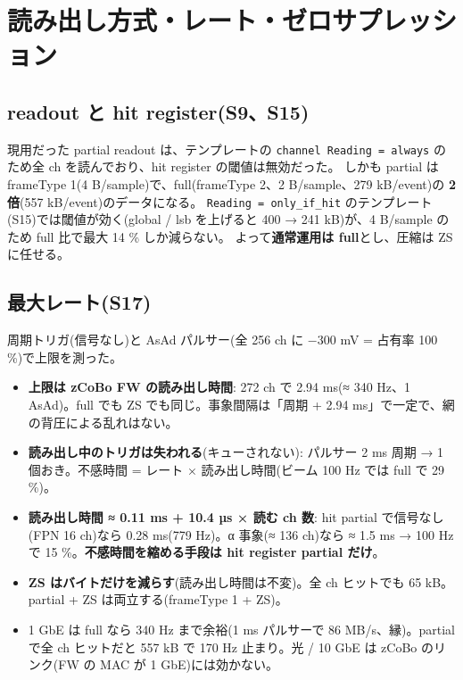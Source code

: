 \documentclass[a4paper,11pt]{ltjsarticle}
\begin{document}
\section{読み出し方式・レート・ゼロサプレッション}

\subsection{readout と hit register(S9、S15)}
現用だった partial readout は、テンプレートの \texttt{channel Reading = always} のため全 ch を読んでおり、hit register の閾値は無効だった。
しかも partial は frameType 1(4 B/sample)で、full(frameType 2、2 B/sample、279 kB/event)の \textbf{2 倍}(557 kB/event)のデータになる。
\texttt{Reading = only\_if\_hit} のテンプレート(S15)では閾値が効く(global / lsb を上げると 400 → 241 kB)が、4 B/sample のため full 比で最大 14 \% しか減らない。
よって\textbf{通常運用は full}とし、圧縮は ZS に任せる。

\subsection{最大レート(S17)}
周期トリガ(信号なし)と AsAd パルサー(全 256 ch に $-300$ mV = 占有率 100 \%)で上限を測った。
\begin{itemize}
\item \textbf{上限は zCoBo FW の読み出し時間}: 272 ch で 2.94 ms(≈ 340 Hz、1 AsAd)。full でも ZS でも同じ。事象間隔は「周期 + 2.94 ms」で一定で、網の背圧による乱れはない。
\item \textbf{読み出し中のトリガは失われる}(キューされない): パルサー 2 ms 周期 → 1 個おき。不感時間 = レート × 読み出し時間(ビーム 100 Hz では full で 29 \%)。
\item \textbf{読み出し時間 ≈ 0.11 ms + 10.4 µs × 読む ch 数}: hit partial で信号なし(FPN 16 ch)なら 0.28 ms(779 Hz)。α 事象(≈ 136 ch)なら ≈ 1.5 ms → 100 Hz で 15 \%。\textbf{不感時間を縮める手段は hit register partial だけ}。
\item \textbf{ZS はバイトだけを減らす}(読み出し時間は不変)。全 ch ヒットでも 65 kB。partial + ZS は両立する(frameType 1 + ZS)。
\item 1 GbE は full なら 340 Hz まで余裕(1 ms パルサーで 86 MB/s、縁)。partial で全 ch ヒットだと 557 kB で 170 Hz 止まり。光 / 10 GbE は zCoBo のリンク(FW の MAC が 1 GbE)には効かない。
\end{itemize}
\end{document}
